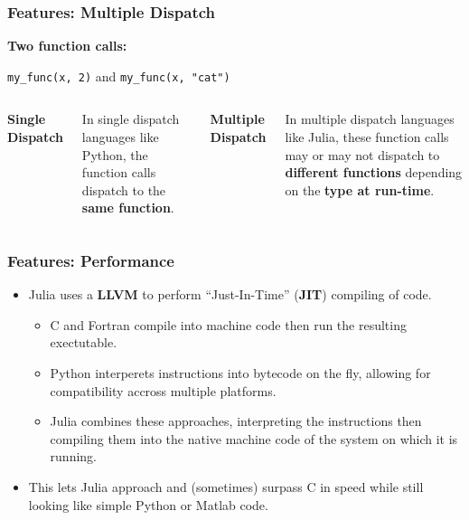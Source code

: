 \documentclass{beamer}
\begin{document}
\begin{frame}[fragile]
	\frametitle{Features: Multiple Dispatch}

	\textbf{Two function calls:} \newline

	\verb|my_func(x, 2)| \quad and \quad \verb|my_func(x, "cat")| \newline

	\begin{columns}
		\column[T]{6cm}
		\textbf{Single Dispatch} \newline

		In single dispatch languages like Python, the function calls dispatch to the \textbf{same function}.

		\column[T]{6cm}
		\textbf{Multiple Dispatch} \newline

		In multiple dispatch languages like Julia, these function calls may or may not dispatch to \textbf{different functions} depending on the \textbf{type at run-time}.
	\end{columns}
\end{frame}

\begin{frame}
	\frametitle{Features: Performance}

	\begin{itemize}
		\item Julia uses a \textbf{LLVM} to perform ``Just-In-Time'' (\textbf{JIT}) compiling of code. \newline

		\begin{itemize}
			\item C and Fortran compile into machine code then run the resulting exectutable. \newline

			\item Python interperets instructions into bytecode on the fly, allowing for compatibility accross multiple platforms. \newline

			\item Julia combines these approaches, interpreting the instructions then compiling them into the native machine code of the system on which it is running. \newline
		\end{itemize}

		\item This lets Julia approach and (sometimes) surpass C in speed while still looking like simple Python or Matlab code.
	\end{itemize}
\end{frame}
\end{document}
